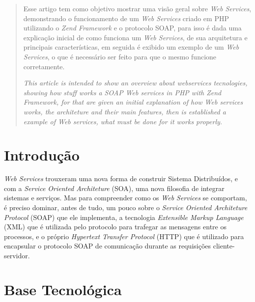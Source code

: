 \documentclass{acm_proc_article-sp}
\begin{document}
\maketitle
\begin{abstract}
		Esse artigo tem como objetivo mostrar uma visão geral sobre \emph{Web Services}, demonstrando o funcionamento de um \emph{Web Services} criado em PHP utilizando o \emph{Zend Framework} e o protocolo SOAP, para isso é dada uma explicação inicial de como funciona um \emph{Web Services}, de sua arquitetura e principais características, em seguida é exibido um exemplo de um \emph{Web Services}, o que é necessário ser feito para que o mesmo funcione corretamente.
		
		
		\emph{This article is intended to show an overview about webservices tecnologies, showing how stuff works a SOAP Web services in PHP with Zend Framework, for that are given an initial explanation of how \emph{Web} services works, the architeture and their main features, then is established a example of  \emph{Web} services, what must be done for it works properly.}
			
\end{abstract}





\section{Introdução}
		\emph{Web Services} trouxeram uma nova forma de construir Sistema Distribuídos, e com a \emph{Service Oriented Architeture} (SOA), uma nova filosofia de integrar sistemas e serviços. Mas para compreender como os \emph{Web Services} se comportam, é preciso dominar, antes de tudo, um pouco sobre o \emph{Service Oriented Architeture Protocol} (SOAP) que ele implementa, a tecnologia \emph{Extensible Markup Language} (XML) que é utilizada pelo protocolo para trafegar as mensagens entre os processos, e o próprio \emph{Hypertext Transfer Protocol} (HTTP) que é utilizado para encapsular o protocolo SOAP de comunicação durante as requisições cliente-servidor.
		
		
\section{Base Tecnológica}
		
\end{document}
